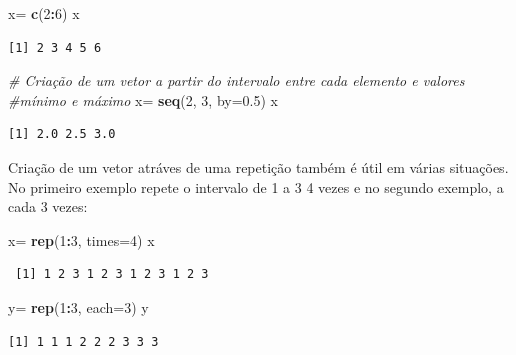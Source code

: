 \documentclass[12pt,brazil,]{book}
\newenvironment{Shaded}{\begin{snugshade}}{\end{snugshade}}
\newcommand{\CommentTok}[1]{\textcolor[rgb]{0.56,0.35,0.01}{\textit{#1}}}
\newcommand{\DataTypeTok}[1]{\textcolor[rgb]{0.13,0.29,0.53}{#1}}
\newcommand{\DecValTok}[1]{\textcolor[rgb]{0.00,0.00,0.81}{#1}}
\newcommand{\FloatTok}[1]{\textcolor[rgb]{0.00,0.00,0.81}{#1}}
\newcommand{\KeywordTok}[1]{\textcolor[rgb]{0.13,0.29,0.53}{\textbf{#1}}}
\newcommand{\NormalTok}[1]{#1}
\newcommand{\OperatorTok}[1]{\textcolor[rgb]{0.81,0.36,0.00}{\textbf{#1}}}
\newcommand{\StringTok}[1]{\textcolor[rgb]{0.31,0.60,0.02}{#1}}
\begin{document}
\begin{Shaded}
\begin{Highlighting}[]
\NormalTok{x=}\StringTok{ }\KeywordTok{c}\NormalTok{(}\DecValTok{2}\OperatorTok{:}\DecValTok{6}\NormalTok{)}
\NormalTok{x}
\end{Highlighting}
\end{Shaded}

\begin{verbatim}
[1] 2 3 4 5 6
\end{verbatim}

\begin{Shaded}
\begin{Highlighting}[]
\CommentTok{# Criação de um vetor a partir do intervalo entre cada elemento e valores}
\CommentTok{#mínimo e máximo}
\NormalTok{x=}\StringTok{ }\KeywordTok{seq}\NormalTok{(}\DecValTok{2}\NormalTok{, }\DecValTok{3}\NormalTok{, }\DataTypeTok{by=}\FloatTok{0.5}\NormalTok{)}
\NormalTok{x}
\end{Highlighting}
\end{Shaded}

\begin{verbatim}
[1] 2.0 2.5 3.0
\end{verbatim}

Criação de um vetor atráves de uma repetição também é útil em várias
situações. No primeiro exemplo repete o intervalo de 1 a 3 4 vezes e no
segundo exemplo, a cada 3 vezes:

\begin{Shaded}
\begin{Highlighting}[]
\NormalTok{x=}\StringTok{ }\KeywordTok{rep}\NormalTok{(}\DecValTok{1}\OperatorTok{:}\DecValTok{3}\NormalTok{, }\DataTypeTok{times=}\DecValTok{4}\NormalTok{)}
\NormalTok{x}
\end{Highlighting}
\end{Shaded}

\begin{verbatim}
 [1] 1 2 3 1 2 3 1 2 3 1 2 3
\end{verbatim}

\begin{Shaded}
\begin{Highlighting}[]
\NormalTok{y=}\StringTok{ }\KeywordTok{rep}\NormalTok{(}\DecValTok{1}\OperatorTok{:}\DecValTok{3}\NormalTok{, }\DataTypeTok{each=}\DecValTok{3}\NormalTok{)}
\NormalTok{y}
\end{Highlighting}
\end{Shaded}

\begin{verbatim}
[1] 1 1 1 2 2 2 3 3 3
\end{verbatim}
\end{document}

